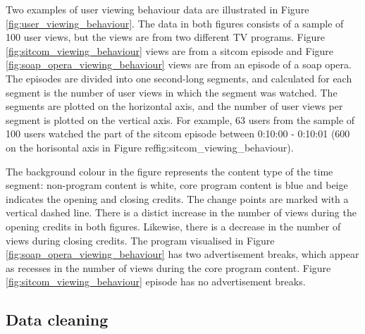 Two examples of user viewing behaviour data are illustrated in Figure \ref{fig:user_viewing_behaviour}. The data in both figures consists of a sample of 100 user views, but the views are from two different TV programs. Figure \ref{fig:sitcom_viewing_behaviour} views are from a sitcom episode and Figure \ref{fig:soap_opera_viewing_behaviour} views are from an episode of a soap opera. The episodes are divided into one second-long segments, and calculated for each segment is the number of user views in which the segment was watched. The segments are plotted on the horizontal axis, and the number of user views per segment is plotted on the vertical axis. For example, 63 users from the sample of 100 users watched the part of the sitcom episode between 0:10:00 - 0:10:01 (600 on the horisontal axis in Figure ref{fig:sitcom_viewing_behaviour}).

The background colour in the figure represents the content type of the time segment: non-program content is white, core program content is blue and beige indicates the opening and closing credits. The change points are marked with a vertical dashed line.
There is a distict increase in the number of views during the opening credits in both figures. Likewise, there is a decrease in the number of views during closing credits.
The program visualised in Figure \ref{fig:soap_opera_viewing_behaviour} has two advertisement breaks, which appear as recesses in the number of views during the core program content. Figure \ref{fig:sitcom_viewing_behaviour} episode has no advertisement breaks.

\subsection{Data cleaning} %

